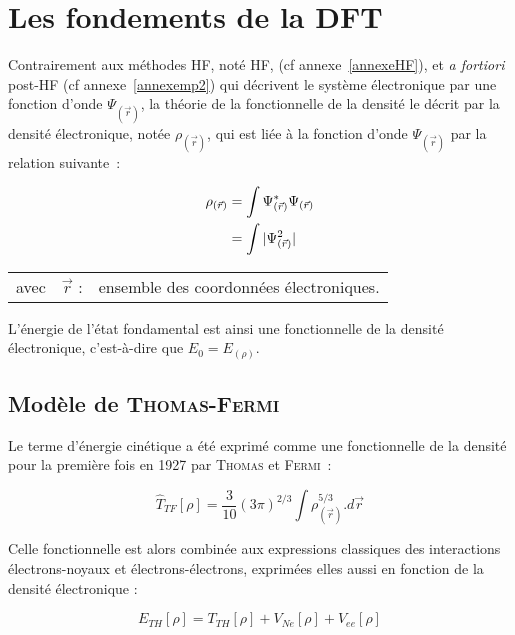 \newpage

\section{Les fondements de la DFT}

Contrairement aux méthodes HF, noté HF, (cf annexe~\ref{annexeHF}), et \textit{a fortiori} post-HF (cf annexe~\ref{annexemp2}) qui décrivent le système électronique par une fonction d'onde $\Psi_{(\vec{r})}$, la théorie de la fonctionnelle de la densité le décrit par la densité électronique, notée $\rho_{(\vec{r})}$, qui est liée à la fonction d'onde $\Psi_{(\vec{r})}$ par la relation suivante~:

\begin{align}
\rho_{(\vec{r})} &= \int \Psi_{(\vec{r})}^{*} \Psi_{(\vec{r})} \\
&= \int |\Psi_{(\vec{r})}^{2}| \notag
\end{align}

\begin{flushleft}
\begin{tabular}{@{}lrp{10cm}}
avec & $\vec{r}$ : & ensemble des coordonnées électroniques. 
\end{tabular}
\end{flushleft}


L'énergie de l'état fondamental est ainsi une fonctionnelle de la densité électronique, c'est-à-dire que $E_{0} = E_{(\rho)}$.

\subsection{Modèle de \textsc{Thomas-Fermi}}

Le terme d'énergie cinétique a été exprimé comme une fonctionnelle de la densité pour la première fois en 1927 par \textsc{Thomas} et \textsc{Fermi}~:

\begin{equation}
\hat{T}_{TF}[\rho] = \frac{3}{10} (3\pi)^{2/3} \int \rho_{(\vec{r})}^{5/3} .d\vec{r}
\label{ener_cin_thom_ferm}
\end{equation}

Celle fonctionnelle est alors combinée aux expressions classiques des interactions électrons-noyaux et électrons-électrons, exprimées elles aussi en fonction de la densité électronique :

\begin{equation}
E_{TH}[\rho] = T_{TH}[\rho] + V_{Ne}[\rho] + V_{ee}[\rho]
\end{equation}

